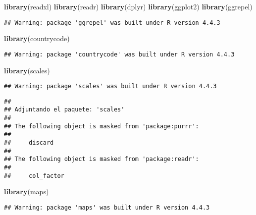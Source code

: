 \documentclass[
]{article}
\newenvironment{Shaded}{\begin{snugshade}}{\end{snugshade}}
\newcommand{\FunctionTok}[1]{\textcolor[rgb]{0.13,0.29,0.53}{\textbf{#1}}}
\newcommand{\NormalTok}[1]{#1}
\begin{document}
\begin{Shaded}
\begin{Highlighting}[]
\FunctionTok{library}\NormalTok{(readxl)}
\FunctionTok{library}\NormalTok{(readr)}
\FunctionTok{library}\NormalTok{(dplyr)}
\FunctionTok{library}\NormalTok{(ggplot2)}
\FunctionTok{library}\NormalTok{(ggrepel)}
\end{Highlighting}
\end{Shaded}

\begin{verbatim}
## Warning: package 'ggrepel' was built under R version 4.4.3
\end{verbatim}

\begin{Shaded}
\begin{Highlighting}[]
\FunctionTok{library}\NormalTok{(countrycode)}
\end{Highlighting}
\end{Shaded}

\begin{verbatim}
## Warning: package 'countrycode' was built under R version 4.4.3
\end{verbatim}

\begin{Shaded}
\begin{Highlighting}[]
\FunctionTok{library}\NormalTok{(scales)}
\end{Highlighting}
\end{Shaded}

\begin{verbatim}
## Warning: package 'scales' was built under R version 4.4.3
\end{verbatim}

\begin{verbatim}
## 
## Adjuntando el paquete: 'scales'
## 
## The following object is masked from 'package:purrr':
## 
##     discard
## 
## The following object is masked from 'package:readr':
## 
##     col_factor
\end{verbatim}

\begin{Shaded}
\begin{Highlighting}[]
\FunctionTok{library}\NormalTok{(maps)}
\end{Highlighting}
\end{Shaded}

\begin{verbatim}
## Warning: package 'maps' was built under R version 4.4.3
\end{verbatim}
\end{document}
